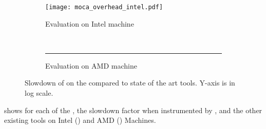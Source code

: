 \begin{figure*}[htb]
    \centering
    \begin{subfigure}{.49\linewidth}
        \texttt{[image: moca\_overhead\_intel.pdf]}
        \caption{Evaluation on Intel machine}
        \label{fig:ovh-Intel}
    \end{subfigure}
    ~
    \begin{subfigure}{.49\linewidth}
        \rule{8cm}{7cm}
        \caption{Evaluation on AMD machine}
        \label{fig:ovh-AMD}
    \end{subfigure}
    \caption{Slowdown of \Moca on the \NPB compared to state of the art tools.
    Y-axis is in log scale.}
    \label{fig:ovh}
\end{figure*}

 shows for each of the \NPB, the slowdown factor when
instrumented by \Moca, \MocaPin and the other existing tools on Intel
() and AMD () Machines.

